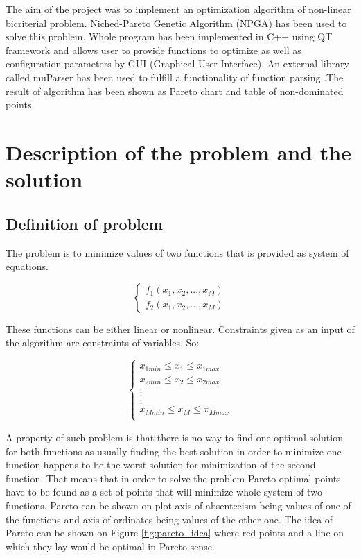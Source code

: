 \documentclass[a4paper, 11pt]{article}
\begin{document}
	The aim of the project was to implement an optimization algorithm of non-linear
	bicriterial problem. Niched-Pareto Genetic Algorithm (NPGA) 
	\cite{OptymailzacjaWielokryterialna} has been used to
	solve this problem. Whole program has been implemented in C++ using QT 	
	framework \cite{Qt} and allows user to provide functions to optimize as well 
	as configuration parameters by GUI (Graphical User Interface). An external
	library called muParser \cite{MuParser} has been used to fulfill a 
	functionality of
	function parsing .The result of algorithm has been shown as Pareto chart and
	table of non-dominated points.
	
	\section{Description of the problem and the solution}
	
	\subsection{Definition of problem}
		
	The problem is to minimize values of two functions that is provided as system
	of equations.
	
	$$\begin{cases}
		f_{1}(x_{1},x_{2},...,x_{M})\\
		f_{2}(x_{1},x_{2},...,x_{M})
	\end{cases}$$
	
	These functions can be either linear or nonlinear. Constraints given as an
	input of the algorithm are constraints of variables. So:
	
	$$\begin{cases}
		x_{1min} \leq x_{1} \leq x_{1max}\\
		x_{2min} \leq x_{2} \leq x_{2max}\\
		.\\
		.\\
		.\\
		x_{Mmin} \leq x_{M} \leq x_{Mmax}\\
	\end{cases}$$
	
	A property of such problem is that there is no way to find one optimal solution
	for both functions as usually finding the best solution in order to minimize
	one function happens to be the worst solution for minimization of the second
	function. That means that in order to solve the problem Pareto optimal points 
	have to be found as a set of points that will minimize whole system of two 
	functions. Pareto can be shown on plot axis of absenteeism being values of
	one of the functions and axis of ordinates being values of the other one.
	The idea of Pareto can be shown on Figure \ref{fig:pareto_idea} where red
	points and a line on which they lay would be optimal in Pareto sense.
	
\end{document}
